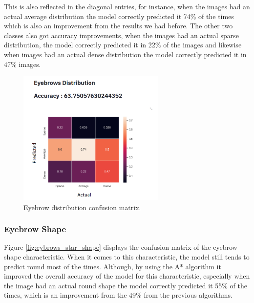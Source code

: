 \documentclass[12pt,a4paper,oneside]{memoir}
\begin{document}
\par

This is also reflected in the diagonal entries, for instance, when the images had an actual average distribution the model correctly predicted it 74\% of the times which is also an improvement from the results we had before. The other two classes also got accuracy improvements, when the images had an actual sparse distribution, the model correctly predicted it in 22\% of the images and likewise when images had an actual dense distribution the model correctly predicted it in 47\% images.    


\begin{figure}[H]
\centering
\includegraphics[width=0.65\textwidth]{images/eyebrows_star_distribution.png}
\caption{Eyebrow distribution confusion matrix.}
\centering
\label{fig:eybrows_star_distr}
\end{figure}


\subsubsection{Eyebrow Shape}
Figure \ref{fig:eybrows_star_shape} displays the confusion matrix of the eyebrow shape characteristic. When it comes to this characteristic, the model still tends to predict round most of the times. Although, by using the A* algorithm it improved the overall accuracy of the model for this characteristic, especially when the image had an actual round shape the model correctly predicted it 55\% of the times, which is an improvement from the 49\% from the previous algorithms.
\end{document}

